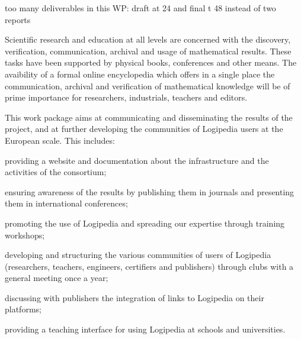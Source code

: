 \begin{workpackage}[id=dissemination,type=MGT,wphases=1-48,
  short={Dissemination},
  title={Dissemination, communication and exploitation},
  lead=Lie,LieRM=2,InrRM=6,BirRM=4,CleRM=2,ImtRM=2,StrRM=2,ZibRM=14,EduRM=12]

{\color{red} too many deliverables in this WP: draft at 24 and final t 48 instead of two reports}


  \begin{wpobjectives}
    Scientific research and education at all levels are concerned with
    the discovery, verification, communication, archival and usage of
    mathematical results. These tasks have been supported by physical
    books, conferences and other means. The avaibility of a formal
    online encyclopedia which offers in a single place the
    communication, archival and verification of mathematical knowledge
    will be of prime importance for researchers, industrials, teachers
    and editors.

    This work package aims at communicating and disseminating the
    results of the project, and at further developing the communities
    of Logipedia users at the European scale. This includes:
    \begin{compactitem}
    \item providing a website and documentation about the
      infrastructure and the activities of the consortium;
    \item ensuring awareness of the results by publishing them in
      journals and presenting them in international conferences;
    \item promoting the use of Logipedia and spreading our expertise
      through training workshops;
    \item developing and structuring the various communities of users
      of Logipedia (researchers, teachers, engineers, certifiers and
      publishers) through clubs with a general meeting once a year;
    \item discussing with publishers the integration of links to
      Logipedia on their platforms;
    \item providing a teaching interface for using Logipedia at
      schools and universities.
    \end{compactitem}
  \end{wpobjectives}



\end{workpackage}

